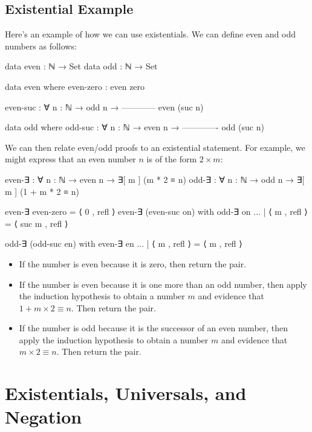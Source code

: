 \documentclass{lecturenotes}
\begin{document}
\subsection{Existential Example}
Here's an example of how we can use existentials.
We can define even and odd numbers as follows:
\begin{code}
data even : ℕ → Set
data odd : ℕ → Set

data even where
  even-zero : even zero

  even-suc : ∀ {n : ℕ} →
        odd n →
     ------------
     even (suc n)

data odd where
  odd-suc : ∀ {n : ℕ} →
      even n →
   -------------
    odd (suc n)
\end{code}

We can then relate even/odd proofs to an existential statement. 
For example, we might express that an even number $n$ is of the form $2 \times m$:
\begin{code}
even-∃ : ∀ {n : ℕ} → even n → ∃[ m ] (m * 2 ≡ n)
odd-∃ : ∀ {n : ℕ} → odd n → ∃[ m ] (1 + m * 2 ≡ n)

even-∃ even-zero = ⟨ 0 , refl ⟩
even-∃ (even-suc on) with odd-∃ on
... | ⟨ m , refl ⟩ = ⟨ suc m , refl ⟩

odd-∃ (odd-suc en) with even-∃ en
... | ⟨ m , refl ⟩ = ⟨ m , refl ⟩
\end{code}
\begin{itemize}
  \item If the number is even because it is zero, then return the pair.
  \item If the number is even because it is one more than an odd number, 
  then apply the induction hypothesis to obtain a number $m$ and evidence that $1 + m \times 2 \equiv n$. Then return the pair.
  \item If the number is odd because it is the successor of an even number, 
  then apply the induction hypothesis to obtain a number $m$ and evidence that $m \times 2 \equiv n$. Then return the pair.
\end{itemize}
\newpage
\section{Existentials, Universals, and Negation}
\label{sec:additional}
\end{document}
